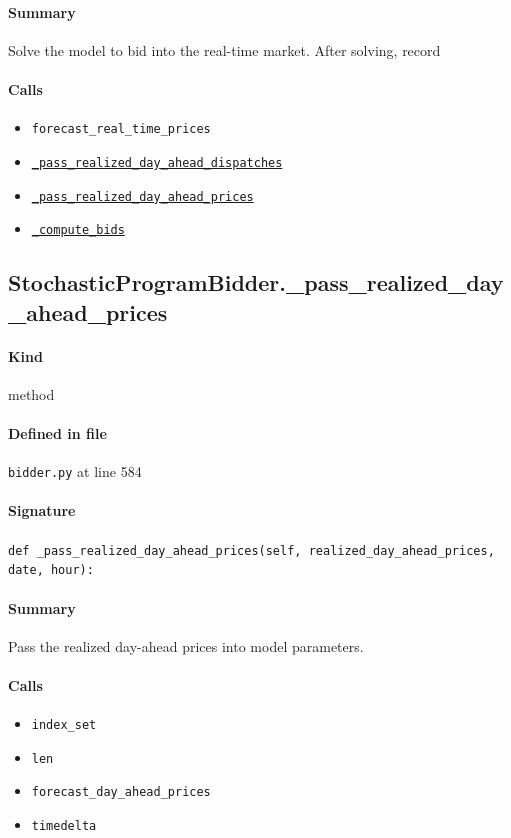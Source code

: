 \documentclass[11pt]{report}
\begin{document}
\paragraph{Summary} Solve the model to bid into the real-time market. After solving, record
\paragraph{Calls}
\begin{itemize}[leftmargin=*]
  \item \texttt{forecast\_real\_time\_prices}
  \item \hyperref[def:bidder.py:StochasticProgramBidder._pass_realized_day_ahead_dispatches:L622]{\texttt{\_pass\_realized\_day\_ahead\_dispatches}}
  \item \hyperref[def:bidder.py:StochasticProgramBidder._pass_realized_day_ahead_prices:L584]{\texttt{\_pass\_realized\_day\_ahead\_prices}}
  \item \hyperref[def:bidder.py:StochasticProgramBidder._compute_bids:L456]{\texttt{\_compute\_bids}}
\end{itemize}
\subsection{StochasticProgramBidder.\_pass\_realized\_day\_ahead\_prices}
\label{def:bidder.py:StochasticProgramBidder._pass_realized_day_ahead_prices:L584}
\paragraph{Kind} method
\paragraph{Defined in file} \texttt{bidder.py} at line 584
\paragraph{Signature} \texttt{def \_pass\_realized\_day\_ahead\_prices(self, realized\_day\_ahead\_prices, date, hour):}
\paragraph{Summary} Pass the realized day-ahead prices into model parameters.
\paragraph{Calls}
\begin{itemize}[leftmargin=*]
  \item \texttt{index\_set}
  \item \texttt{len}
  \item \texttt{forecast\_day\_ahead\_prices}
  \item \texttt{timedelta}
\end{itemize}
\end{document}
